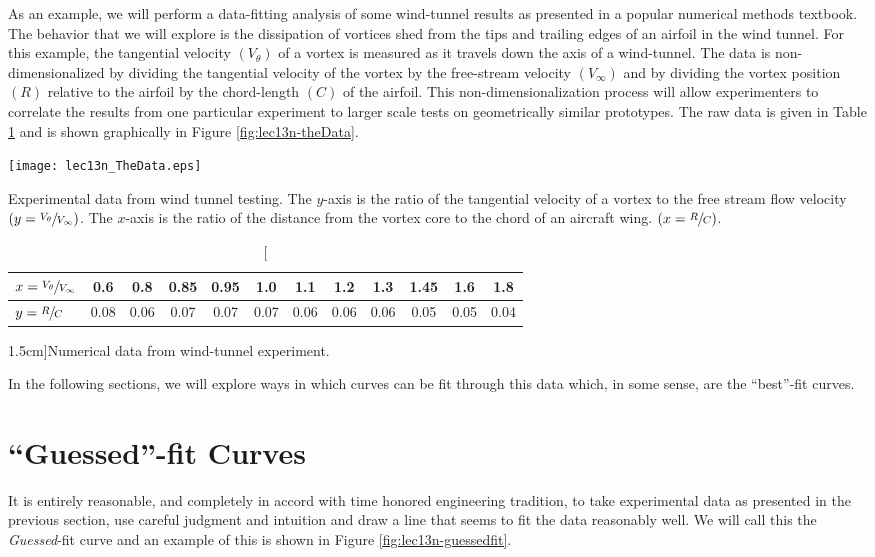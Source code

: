 As an example, we will perform a data-fitting analysis of some wind-tunnel
results as presented in a popular numerical methods textbook.\cite[-1.5cm]{gilat} The behavior that we will explore is the dissipation of vortices shed from the tips and trailing
edges of an airfoil in the wind tunnel.  For this example, the tangential
velocity $\left(V_{\theta}\right)$ of a vortex is measured as it travels down the axis of a
wind-tunnel.  The data is non-dimensionalized by dividing the tangential
velocity of the vortex by the free-stream velocity $\left(V_{\infty}\right)$ and by dividing the vortex
position $\left(R\right)$ relative to the airfoil by the chord-length $\left(C\right)$ of the airfoil.  This non-dimensionalization process will allow experimenters to correlate the results from one particular experiment to larger scale tests on geometrically similar prototypes.  The raw data is given in Table \ref{tab:lec13n-numData} and is shown graphically in Figure \ref{fig:lec13n-theData}.
\begin{marginfigure}[-2.5cm]
\texttt{[image: lec13n\_TheData.eps]}
\caption{Experimental data from wind tunnel testing.  The $y$-axis is the
  ratio of the tangential velocity of a vortex to the free stream flow
  velocity $\left( y = \sfrac{V_{\theta}}{V_{\infty}}\right)$.  The $x$-axis is
  the ratio of the distance from the vortex core to the chord of an aircraft
  wing. $\left(x = \sfrac{R}{C}\right)$.}
\label{fig:lec13n-theData}
\end{marginfigure}
\begin{table}[h]
\centering
\begin{tabular}{|l|*{11}{c}|}
\hline
$x = \sfrac{V_{\theta}}{V_{\infty}}$ & 0.6 & 0.8 & 0.85 & 0.95 & 1.0 & 1.1 &
  1.2 & 1.3 & 1.45 & 1.6 & 1.8 \\
\hline
$y = \sfrac{R}{C}$ & 0.08 & 0.06 & 0.07 & 0.07 & 0.07 & 0.06 & 0.06 & 0.06 & 0.05 &
  0.05 & 0.04 \\
\hline
\end{tabular}
\caption[][1.5cm]{Numerical data from wind-tunnel experiment.}
\label{tab:lec13n-numData}
\end{table}
In the following sections, we will explore ways in which curves can be fit through this data which, in some sense, are the ``best''-fit curves.

\section{``Guessed''-fit Curves}
It is entirely reasonable, and completely in accord with time honored engineering tradition, to take experimental data as presented in the previous section, use careful judgment and intuition and draw a line that seems to fit the data reasonably well. We will call this the \emph{Guessed}-fit curve and an example of this is shown in Figure \ref{fig:lec13n-guessedfit}.

